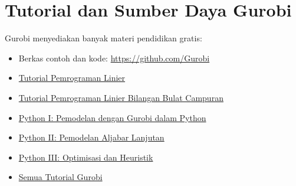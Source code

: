 \section{Tutorial dan Sumber Daya Gurobi}

Gurobi menyediakan banyak materi pendidikan gratis:

\begin{itemize}
\item Berkas contoh dan kode: \url{https://github.com/Gurobi}
\item \href{https://www.gurobi.com/resource/mathematical-programming-tutorial-linear-programming/}{Tutorial Pemrograman Linier}
\item \href{https://www.gurobi.com/resource/tutorial-mixed-integer-linear-programming/}{Tutorial Pemrograman Linier Bilangan Bulat Campuran}
\item \href{https://www.gurobi.com/resource/python-i-webinar/}{Python I: Pemodelan dengan Gurobi dalam Python}
\item \href{https://www.gurobi.com/resource/python-ii-webinar/}{Python II: Pemodelan Aljabar Lanjutan}
\item \href{https://www.gurobi.com/resource/python-iii-webinar/}{Python III: Optimisasi dan Heuristik}
\item \href{https://www.gurobi.com/resources/?category-filter=tutorials}{Semua Tutorial Gurobi}
\end{itemize}
